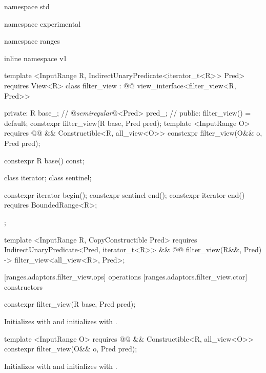 \begin{codeblock}
namespace std { namespace experimental { namespace ranges { inline namespace v1 {
  template <InputRange R, IndirectUnaryPredicate<iterator_t<R>> Pred>
    requires View<R>
  class filter_view : @@ view_interface<filter_view<R, Pred>> {
  private:
    R base_; // \expos
    @\textit{semiregular}@<Pred> pred_; // \expos
  public:
    filter_view() = default;
    constexpr filter_view(R base, Pred pred);
    template <InputRange O>
      requires @@ &&
        Constructible<R, all_view<O>>
    constexpr filter_view(O&& o, Pred pred);

    constexpr R base() const;

    class iterator;
    class sentinel;

    constexpr iterator begin();
    constexpr sentinel end();
    constexpr iterator end() requires BoundedRange<R>;
  };

  template <InputRange R, CopyConstructible Pred>
    requires IndirectUnaryPredicate<Pred, iterator_t<R>> &&
    @@
  filter_view(R&&, Pred) -> filter_view<all_view<R>, Pred>;
}}}}
\end{codeblock}

[ranges.adaptors.filter_view.ops]{ operations}
[ranges.adaptors.filter_view.ctor]{ constructors}

%
\begin{itemdecl}
constexpr filter_view(R base, Pred pred);
\end{itemdecl}

\begin{itemdescr}
\pnum
\effects Initializes  with  and initializes
 with .
\end{itemdescr}

%
\begin{itemdecl}
template <InputRange O>
requires @@ &&
  Constructible<R, all_view<O>>
constexpr filter_view(O&& o, Pred pred);
\end{itemdecl}

\begin{itemdescr}
\pnum
\effects Initializes  with 
and initializes  with .
\end{itemdescr}

